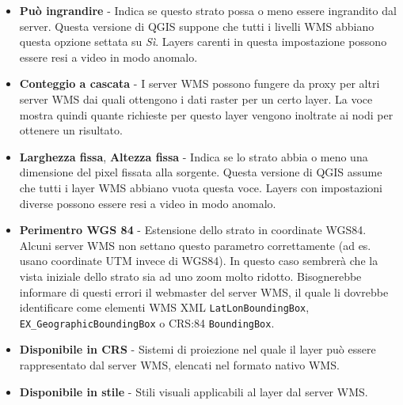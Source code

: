 \begin{itemize}
\begin{itemize}
\item \textbf{Può ingrandire}      - Indica se questo strato possa o meno
                                     essere ingrandito dal server.
				     Questa versione di QGIS suppone che tutti i
                                     livelli WMS abbiano questa opzione settata su \textsl{Sì}.
                                     Layers carenti in questa impostazione
				     possono essere resi a video in modo
				     anomalo.

\item \textbf{Conteggio a cascata}    - I server WMS possono fungere da proxy
                                        per altri server WMS dai quali ottengono
					i dati raster per un certo layer. La
                                        voce mostra quindi quante richieste per questo
					layer vengono inoltrate ai nodi
                                        per ottenere un risultato.

\item \textbf{Larghezza fissa}, \textbf{Altezza fissa}
                                - Indica se lo strato abbia o meno una
				dimensione del pixel fissata alla sorgente.
                                  Questa versione di QGIS assume che tutti i
				  layer WMS abbiano vuota questa voce. Layers
				  con impostazioni diverse possono essere resi
				  a video in modo anomalo.

\item \textbf{Perimentro WGS 84} - Estensione dello strato in coordinate WGS84. Alcuni server
                                   WMS non settano questo parametro correttamente (ad
				   es. usano coordinate UTM invece di WGS84).
				   In questo caso sembrerà che la vista
				   iniziale dello strato
                                   sia ad uno zoom molto ridotto. Bisognerebbe
				   informare di questi errori il webmaster del
				   server WMS, il quale li dovrebbe
				   identificare come elementi
				   WMS XML \texttt{LatLonBoundingBox},
				   \texttt{EX\_GeographicBoundingBox} o CRS:84 \texttt{BoundingBox}.

\item \textbf{Disponibile in CRS} - Sistemi di proiezione nel quale il layer
                                    può essere rappresentato dal server WMS,
				    elencati nel formato nativo WMS.

\item \textbf{Disponibile in stile} - Stili visuali applicabili al layer dal server WMS.

\end{itemize}

\end{itemize}


